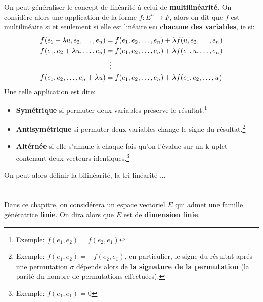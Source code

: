 \subsection*{}
On peut généraliser le concept de linéarité à celui de \textbf{multilinéarité}. On considère alors une application de la forme \(f : E^n \longrightarrow F\), alors on dit que \(f\) est multilinéaire si et seulement si elle est linéaire \textbf{en chacune des variables}, ie si:
\begin{align*}
   f(e_1 + \lambda u, e_2, \ldots, e_n) &= f(e_1, e_2, \ldots, e_n) + \lambda f(u, e_2, \ldots, e_n)  \\
   f(e_1, e_2  + \lambda u, \ldots, e_n) &= f(e_1, e_2, \ldots, e_n) + \lambda f(e_1, u, \ldots, e_n) \\
   & \vdotswithin{=} \\   
   f(e_1, e_2 , \ldots, e_n + \lambda u) &= f(e_1, e_2, \ldots, e_n) + \lambda f(e_1, e_2, \ldots, u)
\end{align*}
Une telle application est dite:
\begin{itemize}
   \item \textbf{Symétrique} si permuter deux variables préserve le résultat.\footnote[1]{Exemple: \(f(e_1, e_2) = f(e_2, e_1)\)}
   \item \textbf{Antisymétrique} si permuter deux variables change le signe du résultat.\footnote[2]{Exemple: \(f(e_1, e_2) = -f(e_2, e_1)\), en particulier, le signe du résultat aprés une permutation \(\sigma\) dépends alors de \textbf{la signature de la permutation} (la parité du nombre de permutations effectuées).}
   \item  \textbf{Altérnée} si elle s'annule à chaque fois qu'on l'évalue sur un k-uplet contenant deux vecteurs identiques.\footnote[3]{Exemple: \(f(e_1, e_1) = 0\)}
\end{itemize}
On peut alors définir la bilinéarité, la tri-linéarité ...

\chapter*{}
Dans ce chapitre, on considérera un espace vectoriel \(E\) qui admet une famille génératrice \textbf{finie}. On dira alors que \(E\) est de \textbf{dimension finie}.\<


